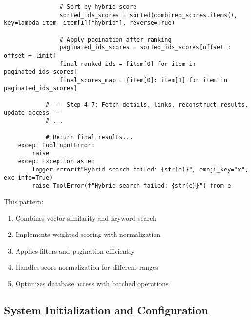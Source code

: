 \documentclass[12pt,a4paper]{article}
\begin{document}
\begin{pageablecode}
\begin{verbatim}
                # Sort by hybrid score
                sorted_ids_scores = sorted(combined_scores.items(), key=lambda item: item[1]["hybrid"], reverse=True)

                # Apply pagination after ranking
                paginated_ids_scores = sorted_ids_scores[offset : offset + limit]
                final_ranked_ids = [item[0] for item in paginated_ids_scores]
                final_scores_map = {item[0]: item[1] for item in paginated_ids_scores}

            # --- Step 4-7: Fetch details, links, reconstruct results, update access ---
            # ...

            # Return final results...
    except ToolInputError:
        raise
    except Exception as e:
        logger.error(f"Hybrid search failed: {str(e)}", emoji_key="x", exc_info=True)
        raise ToolError(f"Hybrid search failed: {str(e)}") from e
\end{verbatim}
\end{pageablecode}
This pattern:
\begin{enumerate}[label=\arabic*.]
    \item Combines vector similarity and keyword search
    \item Implements weighted scoring with normalization
    \item Applies filters and pagination efficiently
    \item Handles score normalization for different ranges
    \item Optimizes database access with batched operations
\end{enumerate}

\subsection*{System Initialization and Configuration}
\end{document}
